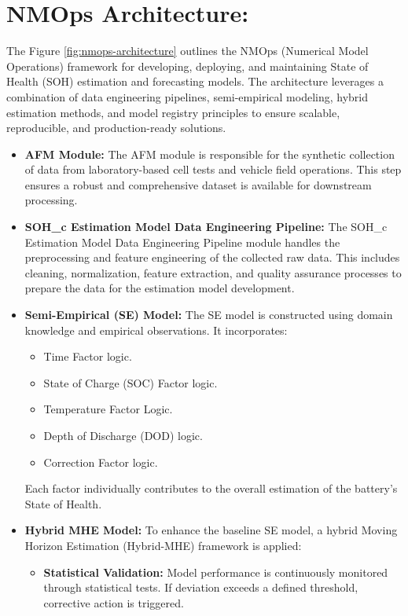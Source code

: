 \section{NMOps Architecture:}
The Figure \ref{fig:nmops-architecture} outlines the NMOps (Numerical Model Operations) framework for developing, deploying, and maintaining State of Health (SOH) estimation and forecasting models. The architecture leverages a combination of data engineering pipelines, semi-empirical modeling, hybrid estimation methods, and model registry principles to ensure scalable, reproducible, and production-ready solutions.

\begin{itemize}
    \item \textbf{AFM Module:} The AFM module is responsible for the synthetic collection of data from laboratory-based cell tests and vehicle field operations. This step ensures a robust and comprehensive dataset is available for downstream processing.
    \item \textbf{SOH\_c Estimation Model Data Engineering Pipeline:} The SOH\_c Estimation Model Data Engineering Pipeline module handles the preprocessing and feature engineering of the collected raw data. This includes cleaning, normalization, feature extraction, and quality assurance processes to prepare the data for the estimation model development.
    \item \textbf{Semi-Empirical (SE) Model:} The SE model is constructed using domain knowledge and empirical observations. It incorporates:
    \begin{itemize}
        \item Time Factor logic.
        \item State of Charge (SOC) Factor logic.
        \item Temperature Factor Logic.
        \item Depth of Discharge (DOD) logic.
        \item Correction Factor logic.
    \end{itemize}
    Each factor individually contributes to the overall estimation of the battery’s State of Health.
    \item \textbf{Hybrid MHE Model:} To enhance the baseline SE model, a hybrid Moving Horizon Estimation (Hybrid-MHE) framework is applied:
    \begin{itemize}
        \item \textbf{Statistical Validation:} Model performance is continuously monitored \\through statistical tests. If deviation exceeds a defined threshold, corrective action is triggered.

\end{itemize}
\end{itemize}
